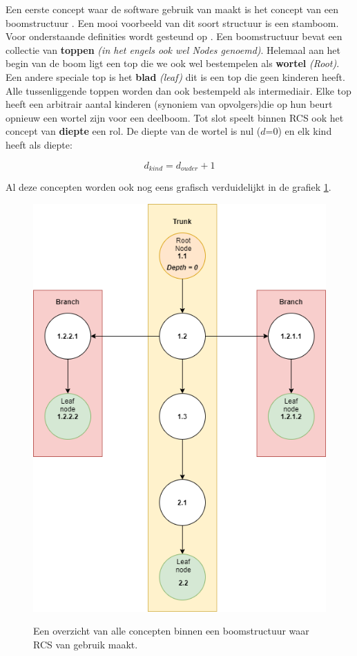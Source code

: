 Een eerste concept waar de software gebruik van maakt is het concept van een boomstructuur . Een mooi voorbeeld van dit soort structuur is een stamboom. Voor onderstaande definities wordt gesteund op \textcite{Lievens2019}. Een boomstructuur bevat een collectie van \textbf{toppen} \textit{(in het engels ook wel Nodes genoemd)}. Helemaal aan het begin van de boom ligt een top die we ook wel bestempelen als \textbf{wortel} \textit{(Root)}. Een andere speciale top is het \textbf{blad} \textit{(leaf)} dit is een top die geen kinderen heeft. Alle tussenliggende toppen worden dan ook bestempeld als intermediair. Elke top heeft een arbitrair aantal kinderen (synoniem van opvolgers)die op hun beurt opnieuw een wortel zijn voor een deelboom. Tot slot speelt binnen RCS ook het concept van \textbf{diepte} een rol. De diepte van de wortel is nul ($d$=0) en elk kind heeft als diepte: 

\begin{equation}
	d_{kind} = d_{ouder} + 1
\end{equation}

Al deze concepten worden ook nog eens grafisch verduidelijkt in de grafiek \ref{fig:tree1}.

\begin{figure}
\centering
  	\includegraphics[scale=0.5]{tree1.png}
	\label{fig:tree1}
\caption[Overzicht concepten boomstructuur]{Een overzicht van alle concepten binnen een boomstructuur waar RCS van gebruik maakt.}
\end{figure}

